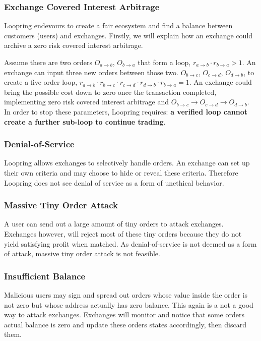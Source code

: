 \documentclass[UTF8,nofonts]{article}
\begin{document}
\subsubsection{Exchange Covered Interest Arbitrage}

Loopring endevours to create a fair ecosystem and find a balance between customers (users) and exchanges. Firstly, we will explain how an exchange could archive a zero risk covered interest arbitrage.

Assume there are two orders $O_{a\rightarrow b}$, $O_{b\rightarrow a}$ that form a loop, $r_{a\rightarrow b} \cdot r_{b\rightarrow a} > 1$. An exchange can input three new orders between those two. $O_{b\rightarrow c}$, $O_{c\rightarrow d}$, $O_{d\rightarrow b}$, to create a five order loop,  $r_{a\rightarrow b} \cdot r_{b\rightarrow c} \cdot r_{c\rightarrow d}\cdot r_{d\rightarrow b}\cdot r_{b\rightarrow a} = 1$. An exchange could bring the possible cost down to zero once the transaction completed, implementing zero risk covered interest arbitrage
and $O_{b\rightarrow c}\rightarrow O_{c\rightarrow d}\rightarrow O_{d\rightarrow b}$. In order to stop these parameters, Loopring requires: {\bfseries a verified loop cannot create a further sub-loop to continue trading}.

\subsubsection{Denial-of-Service}

Loopring allows exchanges to selectively handle orders. An exchange can set up their own criteria and may choose to hide or reveal these criteria. Therefore Loopring does not see denial of service as a form of unethical behavior.

\subsubsection{Massive Tiny Order Attack}
A user can send out a large amount of tiny orders to attack exchanges. Exchanges however, will reject most of these tiny orders because they do not yield satisfying profit when matched. As denial-of-service is not deemed as a form of attack, massive tiny order attack is not feasible.

\subsubsection{Insufficient Balance}

Malicious users may sign and spread out orders whose value inside the order is not zero but whose address actually has zero balance. This again is a not a good way to attack exchanges. Exchanges will monitor and notice that some orders actual balance is zero and update these orders states accordingly, then discard them.  
\end{document}
